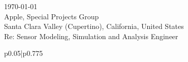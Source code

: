 \documentclass[12pt]{article} %
\begin{document}
\begin{paracol}{2} %


\parbox[top][0.1\textheight][c]{\linewidth}{ %
	\vspace{0.0\textheight} %
	\today\\[6pt]
	Apple, Special Projects Group\\
	Santa Clara Valley (Cupertino), California, United States\\
	Re: Sensor Modeling, Simulation and Analysis Engineer\\[6pt] \medskip
}


\switchcolumn %


\parbox[top][0.1\textheight][c]{\linewidth}{ %
	\vspace{0\textheight} %
	\colorbox{shade}{ %
		\begin{supertabular}{p{0.05\linewidth}|p{0.775\linewidth}} %
			\ifthenelse{\equal{\cvdate}{}}{}{\raisebox{-1pt}{\faInfo} & \cvdate \\}
			\ifthenelse{\equal{\cvaddress}{}}{}{\raisebox{-1pt}{\faHome} & \cvaddress \\} %
			\ifthenelse{\equal{\cvaddress}{}}{}{\raisebox{-1pt}{\faPhone} & \cvnumberphone \\} %
		\end{supertabular}
	}
}


\end{paracol}
\end{document}
